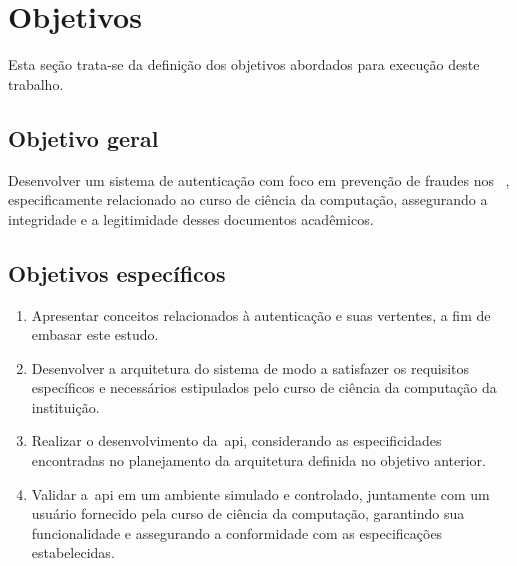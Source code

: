 \section{Objetivos}\label{sec:objetivos}

Esta seção trata-se da definição dos objetivos abordados para
execução deste trabalho.
\subsection{Objetivo geral}\label{subsec:objetivo-geral}

Desenvolver um sistema de autenticação com foco em prevenção de fraudes nos
~, especificamente relacionado ao curso de ciência da computação,
assegurando a integridade e a legitimidade desses documentos acadêmicos.
\subsection{Objetivos específicos}\label{subsec:objetivos-especificos}

\newcommand{\buscaReferencia}{
    Apresentar conceitos relacionados à autenticação e suas vertentes, a fim de
    embasar este estudo.
}

\newcommand{\arquitetura}{
    Desenvolver a arquitetura do sistema de modo a satisfazer os requisitos
    específicos e necessários estipulados pelo curso de ciência da computação da instituição.
}

\newcommand{\implementacao}{
    Realizar o desenvolvimento da~\acrshort{api}, considerando as especificidades
    encontradas no planejamento da arquitetura definida no objetivo anterior.
}

\newcommand{\testes}{
    Validar a~\acrshort{api} em um ambiente simulado e controlado, juntamente com um usuário fornecido
    pela curso de ciência da computação, garantindo sua funcionalidade e
    assegurando a conformidade com as especificações estabelecidas.
}

\begin{enumerate}[label=\alph*)]
    \item  \buscaReferencia
    \item  \arquitetura
    \item  \implementacao
    \item  \testes
\end{enumerate}